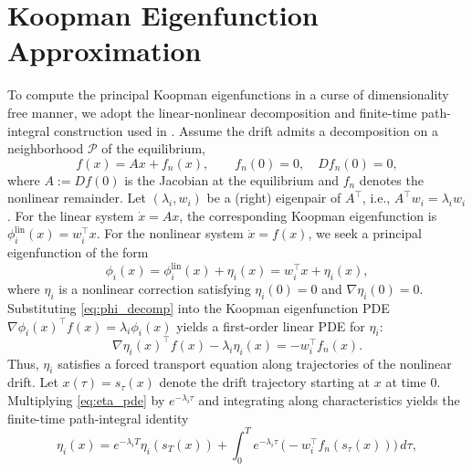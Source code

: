 \documentclass[letterpaper, 10 pt, conference]{ieeeconf}
\theoremstyle{plain}
\theoremstyle{definition}
\begin{document}
\section{Koopman Eigenfunction Approximation} \label{sec:eigenfunction_compute}


To compute the principal Koopman eigenfunctions in a curse of dimensionality free manner, we adopt the linear-nonlinear decomposition and finite-time path-integral construction used in \cite{deka2023path}. Assume the drift admits a decomposition on a neighborhood \(\mathcal P\) of the equilibrium,
\begin{equation}\label{eq:split}
f(x)=Ax+f_n(x), \qquad f_n(0)=0,\quad Df_n(0)=0,
\end{equation}
where \(A:=Df(0)\) is the Jacobian at the equilibrium and \(f_n\) denotes the nonlinear remainder.
Let \((\lambda_i,w_i)\) be a (right) eigenpair of \(A^\top\), i.e., $A^\top w_i = \lambda_i w_i$.
For the linear system \(\dot x=Ax\), the corresponding Koopman eigenfunction is
\(\phi_i^{\mathrm{lin}}(x)=w_i^\top x\).
For the nonlinear system \(\dot x=f(x)\), we seek a principal eigenfunction of the form
\begin{equation}\label{eq:phi_decomp}
    \phi_i(x)=\phi_i^{\mathrm{lin}}(x)+\eta_i(x)
    = w_i^\top x+\eta_i(x),
\end{equation}
where \(\eta_i\) is a nonlinear correction satisfying \(\eta_i(0)=0\) and \(\nabla \eta_i(0)=0\).
Substituting \eqref{eq:phi_decomp} into the Koopman eigenfunction PDE
\(\nabla\phi_i(x)^\top f(x)=\lambda_i \phi_i(x)\) yields a first-order linear PDE for \(\eta_i\):
\begin{equation}\label{eq:eta_pde}
    \nabla \eta_i(x)^\top f(x) - \lambda_i \eta_i(x)
    =
    - w_i^\top f_n(x).
\end{equation}
Thus, \(\eta_i\) satisfies a forced transport equation along trajectories of the nonlinear drift. Let \(x(\tau)=s_\tau(x)\) denote the drift trajectory starting at \(x\) at time \(0\).
Multiplying \eqref{eq:eta_pde} by \(e^{-\lambda_i \tau}\) and integrating along characteristics
yields the finite-time path-integral identity
\begin{equation}\label{eq:path_integral_eta_finite}
    \eta_i(x)
    =
    e^{-\lambda_i T}\eta_i(s_T(x))
    +
    \int_{0}^{T} e^{-\lambda_i \tau}\, \big(-w_i^\top f_n(s_\tau(x))\big)\, d\tau,
\end{equation}
\end{document}
